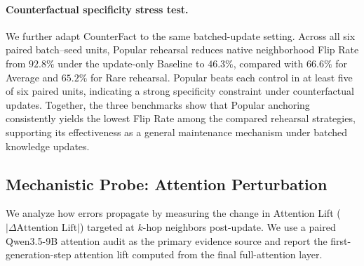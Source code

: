 \paragraph{Counterfactual specificity stress test.}
We further adapt CounterFact to the same batched-update setting.  Across
all six paired batch--seed units, Popular rehearsal reduces native
neighborhood Flip Rate from $92.8\%$ under the update-only Baseline to
$46.3\%$, compared with $66.6\%$ for Average and $65.2\%$ for Rare
rehearsal.  Popular beats each control in at least five of six paired
units, indicating a strong specificity constraint under counterfactual
updates.  Together, the three benchmarks show that Popular anchoring
consistently yields the lowest Flip Rate among the compared rehearsal
strategies, supporting its effectiveness as a general maintenance
mechanism under batched knowledge updates.

\subsection{Mechanistic Probe: Attention Perturbation}
\label{subsec:mechanisms}


We analyze how errors propagate by measuring the change in Attention Lift ($|\Delta \text{Attention Lift}|$) targeted at $k$-hop neighbors post-update. 
We use a paired Qwen3.5-9B attention audit as the primary evidence source and report the first-generation-step attention lift computed from the final full-attention layer.









